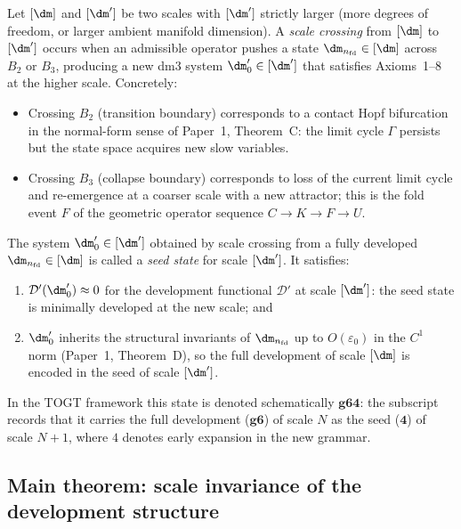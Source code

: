 \begin{definition}\label{def:scalecross}
Let $[\dm]$ and $[\dm']$ be two scales with $[\dm']$ strictly
larger (more degrees of freedom, or larger ambient manifold
dimension). A \emph{scale crossing} from $[\dm]$ to $[\dm']$ occurs
when an admissible operator pushes a state
$\dm_{n_{\mathrm{fd}}} \in [\dm]$ across $B_2$ or $B_3$, producing
a new dm3 system $\dm'_0 \in [\dm']$ that satisfies Axioms~1--8 at
the higher scale. Concretely:
\begin{itemize}
  \item Crossing $B_2$ (transition boundary) corresponds to a contact
    Hopf bifurcation in the normal-form sense of Paper~1, Theorem~C:
    the limit cycle $\Gamma$ persists but the state space acquires
    new slow variables.
  \item Crossing $B_3$ (collapse boundary) corresponds to loss of
    the current limit cycle and re-emergence at a coarser scale with
    a new attractor; this is the fold event $F$ of the geometric
    operator sequence $C \to K \to F \to U$.
\end{itemize}
\end{definition}

\begin{definition}\label{def:seed}
The system $\dm'_0 \in [\dm']$ obtained by scale crossing from a
fully developed $\dm_{n_{\mathrm{fd}}} \in [\dm]$ is called a
\emph{seed state} for scale $[\dm']$. It satisfies:
\begin{enumerate}[label=(\roman*)]
  \item $\mathcal{D}'(\dm'_0) \approx 0$ for the development
    functional $\mathcal{D}'$ at scale $[\dm']$: the seed state is
    minimally developed at the new scale; and
  \item $\dm'_0$ inherits the structural invariants of
    $\dm_{n_{\mathrm{fd}}}$ up to $O(\varepsilon_0)$ in the $C^1$
    norm (Paper~1, Theorem~D), so the full development of scale
    $[\dm]$ is encoded in the seed of scale $[\dm']$.
\end{enumerate}
In the TOGT framework this state is denoted schematically
$\mathbf{g64}$: the subscript records that it carries the full
development ($\mathbf{g6}$) of scale $N$ as the seed ($\mathbf{4}$)
of scale $N{+}1$, where $4$ denotes early expansion in the new
grammar.
\end{definition}

\subsection{Main theorem: scale invariance of the development
  structure}

